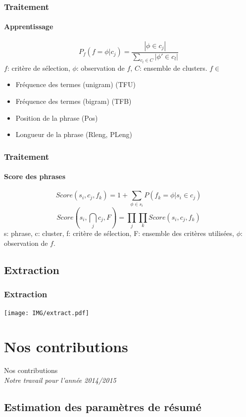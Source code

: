 \documentclass{beamer}
\begin{document}
\begin{frame}
\frametitle{Traitement}
\framesubtitle{Apprentissage}
\[ P_{f}(f = \phi | c_j) = \frac {|\phi \in c_j|}{\sum_{c_l \in C}{|\phi' \in c_l|}} \]
$ f $: critère de sélection, $ \phi $: observation de $ f $, $ C $: ensemble de clusters.
\vfill
$ f \in $
\begin{itemize}
\item Fréquence des termes (unigram) (TFU)
\item Fréquence des termes (bigram) (TFB)
\item Position de la phrase (Pos)
\item Longueur de la phrase (Rleng, PLeng)
\end{itemize}
\end{frame}

\begin{frame}
\frametitle{Traitement}
\framesubtitle{Score des phrases}
\[ Score(s_i , c_j , f_k ) = 1 + \sum_{\phi \in s_i} {P(f_k=\phi | s_i \in c_j)} \]
\[ Score(s_i , \bigcap_{j} c_j , F) =  %
\prod_{j} \prod_{k} Score(s_i , c_j , f_k ) \]
\vfill
s: phrase, c: cluster, f: critère de sélection, F: ensemble des critères utilisées, $ \phi $: observation de $ f $.
\end{frame}

\subsection{Extraction}

\begin{frame}
\frametitle{Extraction}
\begin{center}
\texttt{[image: IMG/extract.pdf]}
\end{center}
\end{frame}

\section{Nos contributions}

\begin{frame}
\begin{center}
{\Huge Nos contributions}\\
{\LARGE \textit{Notre travail pour l'année 2014/2015}}
\end{center}
\end{frame}

\subsection{Estimation des paramètres de résumé}
\end{document}
